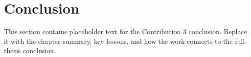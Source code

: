 \section{Conclusion}
\label{sec::contrib3::conclusion}

This section contains placeholder text for the Contribution 3 conclusion. Replace it with the chapter summary, key lessons, and how the work connects to the full-thesis conclusion.
